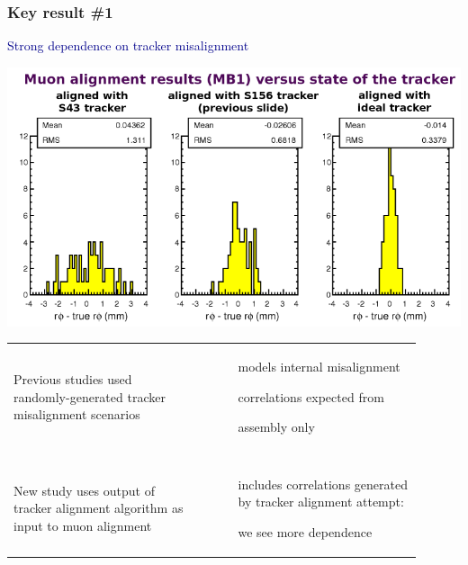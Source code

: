 \documentclass[compress]{beamer}
\begin{document}
\begin{frame}
\frametitle{Key result \#1}
\small

\hspace{-0.83 cm} \textcolor{darkblue}{\Large Strong dependence on tracker misalignment}

\vspace{-0.1 cm}
\begin{center}
\includegraphics[width=0.7\linewidth]{muonalignment_MB1_dep_on_tracker.png}
\end{center}

\vspace{-0.25 cm} \renewcommand{\arraystretch}{0.6}
\begin{tabular}{p{0.45\linewidth} c | c p{0.45\linewidth}}
Previous studies used randomly-generated tracker misalignment scenarios & & & models internal misalignment

correlations expected from

assembly only \\

& & & \\\hline

& & & \\

New study uses output of tracker alignment algorithm as input to muon alignment & & & includes correlations generated by tracker alignment attempt:

we see more dependence

\end{tabular}

\end{frame}
\end{document}

